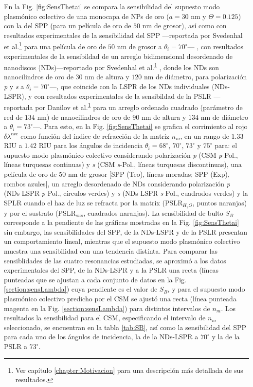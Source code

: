 En la Fig. \ref{fig:SensThetai} se compara la sensibilidad del supuesto modo  plasmónico colectivo de una monocapa de NPs de oro ($a=30$ nm y $\Theta=0.125$) con la del SPP (para un película de oro de $50$ nm de grosor), así como con resultados experimentales de la sensibilidad del SPP ---reportada por  Svedenhal et al.\footnote{\label{fn:Motivacion}Ver capítulo \ref{chapter:Motivacion} para una descripción más detallada de sus resultados.} \cite{svedendahl2009refractometric} para una película de oro de $50$ nm de grosor a $\theta_i = 70^\circ$--- , con resultados experimentales de la sensibildad de un  arreglo bidimensional desordenado de nanodiscos (NDs)---reportado por Svedenhal et al.\textsuperscript{\ref{fn:Motivacion}}  \cite{svedendahl2009refractometric}, donde los NDs son nanocilindros de oro de $30$ nm de altura y $120$ nm de diámetro, para polarización \emph{p} y \emph{s} a $\theta_i = 70^\circ$---, que coincide con la LSPR de los NDs individuales (NDs-LSPR), y con resultados experimentales de la sensibildad de la PSLR ---reportada por Danilov et al.\textsuperscript{\ref{fn:Motivacion}} \cite{danilov2018ultra} para un arreglo ordenado cuadrado (parámetro de red de $134$ nm) de nanocilindros de oro de $90$ nm de altura y $134$ nm de diámetro a $\theta_i= 73^\circ$---. Para esto, en la Fig. \ref{fig:SensThetai} se grafica el corrimiento al rojo $\delta\lambda^{exc}$ como función del índice de refracción de la matriz $n_m$, en un rango de $1.33$ RIU a $1.42$ RIU para los ángulos de incidencia $\theta_i = 68^\circ$, $70^\circ$, $73^\circ$ y $75^\circ$ para: el supuesto modo  plasmónico colectivo considerando polarización \emph{p} (CSM \textit{p}-Pol., líneas turquesas continuas) y \emph{s} (CSM \textit{s}-Pol., líneas turquesas discontinuas), una película de oro de $50$ nm de grosor [SPP (Teo), líneas moradas; SPP (Exp), rombos azules], un arreglo desordenado de NDs  considerando polarización \emph{p} (NDs-LSPR \textit{p}-Pol., círculos verdes) y \emph{s} (NDs-LSPR \textit{s}-Pol., cuadrados verdes) y la SPLR cuando el haz de luz se refracta por la matrix (PSLR$_{H_{2}O}$, puntos naranjas) y por el sustrato (PSLR$_{sus}$, cuadrados naranjas). La sensibilidad de bulto $S_B$ corresponde a la pendiente de las gráficas mostradas en la Fig. \ref{fig:SensThetai} sin embargo, las sensibilidades del SPP, de la NDs-LSPR y de la PSLR presentan un comportamiento lineal, mientras que el supuesto modo  plasmónico colectivo muestra una sensibilidad con una tendencia distinta. Para comparar las sensiblidades de las cuatro resonancias estudiadas, se aproximó a los datos experimentales del SPP, de la NDs-LSPR y a la PSLR una recta (líneas punteadas que se ajustan a cada conjunto de datos en la Fig. \ref{section:sensLambda}) cuya pendiente es el valor de $S_B$, y para el supuesto modo  plasmónico colectivo predicho por el CSM se ajustó una recta (línea punteada magenta en la Fig. \ref{section:sensLambda}) para distintos intervalos de $n_m$. Los resultados la sensibilidad para el CSM, especificando el  intervalo de $n_m$ seleccionado, se  encuentran en la tabla \ref{tab:SB}, así como la sensibilidad del SPP para cada uno de los ángulos de incidencia, la de la NDs-LSPR a $70^\circ$ y la de la PSLR a $73^\circ$.


